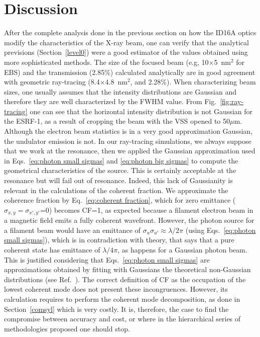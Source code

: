 \documentclass{iucr}              %
\begin{document}
\section{Discussion} 
\label{discussion}

After the complete analysis done in the previous section on how the ID16A optics modify the characteristics of the X-ray beam, one can verify that the analytical previsions (Section~\ref{level0}) were a good estimator of the values obtained using more sophisticated methods. The size of the focused beam (e.g, 10$\times$5~nm$^2$ for EBS) and the transmission (2.85\%) calculated analytically are in good agreement with geometric ray-tracing (8.4$\times$4.8~nm$^2$, and 2.28\%). When characterizing beam sizes, one usually assumes that the intensity distributions are Gaussian and therefore they are well characterized by the FWHM value. From Fig.~\ref{fig:ray-tracing} one can see that the horizontal intensity distribution is not Gaussian for the ESRF-1, as a result of cropping the beam with the VSS opened to 50$\mu$m. Although the electron beam statistics is in a very good approximation Gaussian, the undulator emission is not. In our ray-tracing simulations, we always suppose that we work at the resonance, then we applied the Gaussian approximation used in Eqs.~\ref{eq:photon small sigmas} and \ref{eq:photon big sigmas} to compute the geometrical characteristics of the source. This is certainly acceptable at the resonance but will fail out of resonance. Indeed, this lack of Gaussianity is relevant in the calculations of the coherent fraction. We approximate the coherence fraction by Eq.~\ref{eq:coherent fraction}, which for zero emittance ($\sigma_{x,y}=\sigma_{x',y'}$=0) becomes CF=1, as expected because a filament electron beam in a magnetic field emits a fully coherent wavefront. However, the photon source for a filament beam would have an emittance of $\sigma_u \sigma_{u'} \approx \lambda / 2 \pi$ (using Eqs.~\ref{eq:photon small sigmas}), which is in contradiction with theory, that says that a pure coherent state has emittance of $\lambda / 4 \pi$, as happens for a Gaussian photon beam. This is justified considering that Eqs.~\ref{eq:photon small sigmas} are approximations obtained by fitting with Gaussians the theoretical non-Gaussian distributions (see Ref.~\cite{elleaume}). The correct definition of CF as the occupation of the lowest coherent mode does not present these incongruences. However, its calculation requires to perform the coherent mode decomposition, as done in Section~\ref{comsyl} which is very costly. It is, therefore, the case to find the compromise between accuracy and cost, or where in the hierarchical series of methodologies proposed one should stop. 
\end{document}

